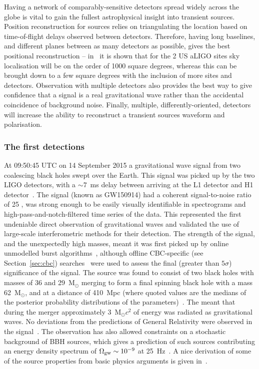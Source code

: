 Having a network of comparably-sensitive detectors spread widely across the
globe is vital to gain the fullest astrophysical insight into transient sources.
Position reconstruction for sources relies on triangulating the location based
on time-of-flight delays observed between detectors. Therefore, having long
baselines, and different planes between as many detectors as possible, gives the
best positional reconstruction -- in~\cite{Fairhurst:2010} it is shown that for
the 2 US aLIGO sites sky localisation will be on the order of 1000 square degrees,
whereas this can be brought down to a few square degrees with the inclusion of
more sites and detectors. Observation with multiple detectors also provides the
best way to give confidence that a signal is a real gravitational wave rather
than the accidental coincidence of background noise. Finally, multiple,
differently-oriented, detectors will increase the ability to reconstruct a
transient sources waveform and polarisation.

\subsubsection{The first detections}

At 09:50:45 UTC on 14 September 2015 a gravitational wave signal from two coalescing black holes swept 
over the Earth. This signal was picked up by the two LIGO detectors, with a $\sim 7$~ms delay between 
arriving at the L1 detector and H1 detector~\cite{GW150914}. The signal (known as GW150914) had a coherent signal-to-noise 
ratio of 25 \cite{2016PhRvL.116x1102A}, was strong enough to be easily visually identifiable in spectrograms 
and high-pass-and-notch-filtered time series of the data. This represented the first undeniable direct observation of 
gravitational waves and validated the use of large-scale interferometric methods for their detection. The strength of
the signal, and the unexpectedly high masses, meant it was first picked up by online unmodelled burst algorithms~\cite{2016PhRvD..93l2004A},
although offline CBC-specific (see Section~\ref{sec:cbc}) searches~\cite{2016CQGra..33u5004U, 2016arXiv160404324M} were used to assess
the final (greater than $5\sigma$) significance of the signal.
The source was found to consist of two black holes with masses of 36 and 29~M$_{\odot}$ merging to form a
final spinning black hole with a mass 62~M$_{\odot}$, and at a distance of 410~Mpc (where quoted values are the medians
of the posterior probability distributions of the parameters)~\cite{2016PhRvL.116x1102A}. The meant that during the merger
approximately 3~M$_{\odot}c^2$ of energy was radiated as gravitational waves. No deviations from the predictions of
General Relativity were observed in the signal~\cite{2016PhRvL.116v1101A}. The observation has also allowed constraints on a
stochastic background of BBH sources, which gives a prediction of such sources contributing an energy density spectrum of
$\Omega_{\rm gw} \sim 10^{-9}$ at 25~Hz~\cite{2016PhRvL.116m1102A}. A nice derivation of some of the source properties
from basic physics arguments is given in~\cite{basicphys}.

